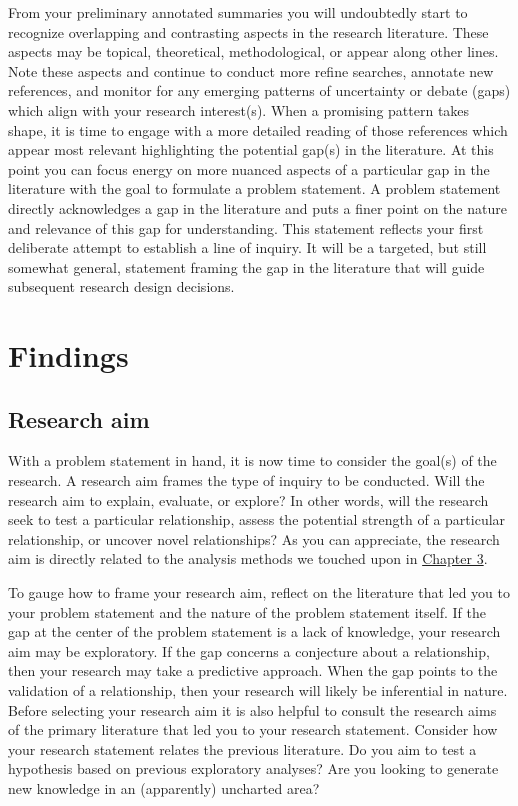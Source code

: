 \documentclass[
  letterpaper,
]{latex/krantz}
\begin{document}
From your preliminary annotated summaries you will undoubtedly start to
recognize overlapping and contrasting aspects in the research
literature. These aspects may be topical, theoretical, methodological,
or appear along other lines. Note these aspects and continue to conduct
more refine searches, annotate new references, and monitor for any
emerging patterns of uncertainty or debate (gaps) which align with your
research interest(s). When a promising pattern takes shape, it is time
to engage with a more detailed reading of those references which appear
most relevant highlighting the potential gap(s) in the literature. At
this point you can focus energy on more nuanced aspects of a particular
gap in the literature with the goal to formulate a problem statement. A
problem statement directly acknowledges a gap in the literature and puts
a finer point on the nature and relevance of this gap for understanding.
This statement reflects your first deliberate attempt to establish a
line of inquiry. It will be a targeted, but still somewhat general,
statement framing the gap in the literature that will guide subsequent
research design decisions.

\hypertarget{findings}{%
\section{Findings}\label{findings}}

\hypertarget{research-aim}{%
\subsection{Research aim}\label{research-aim}}

With a problem statement in hand, it is now time to consider the goal(s)
of the research. A research aim frames the type of inquiry to be
conducted. Will the research aim to explain, evaluate, or explore? In
other words, will the research seek to test a particular relationship,
assess the potential strength of a particular relationship, or uncover
novel relationships? As you can appreciate, the research aim is directly
related to the analysis methods we touched upon in
\protect\hyperlink{sec-approaching-analysis}{Chapter 3}.

To gauge how to frame your research aim, reflect on the literature that
led you to your problem statement and the nature of the problem
statement itself. If the gap at the center of the problem statement is a
lack of knowledge, your research aim may be exploratory. If the gap
concerns a conjecture about a relationship, then your research may take
a predictive approach. When the gap points to the validation of a
relationship, then your research will likely be inferential in nature.
Before selecting your research aim it is also helpful to consult the
research aims of the primary literature that led you to your research
statement. Consider how your research statement relates the previous
literature. Do you aim to test a hypothesis based on previous
exploratory analyses? Are you looking to generate new knowledge in an
(apparently) uncharted area?
\end{document}
